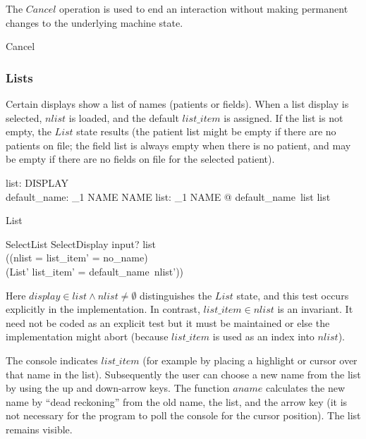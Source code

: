 \documentclass{article}
\begin{document}
The $Cancel$ operation is used to end an interaction without making
permanent changes to the underlying machine state.

\begin{zed} Cancel  \end{zed}

\subsubsection{Lists}

Certain displays show a list of names (patients or fields).  When a
list display is selected, $nlist$ is loaded, and the default $list\_item$
is assigned. If the list is not empty, the $List$ state results (the
patient list might be empty if there are no patients on file; the
field list is always empty when there is no patient, and may be empty
if there are no fields on file for the selected patient).

\begin{axdef}
	list: \power DISPLAY \\
	default\_name: \power_1 NAME \fun NAME 
\where 
	\forall list: \power_1 NAME @ default\_name~list \in list
\end{axdef}


\begin{zed} 
List 
\end{zed}

\begin{schema}{SelectList}
	SelectDisplay
\where
	input? \in list \\
	((nlist = \emptyset \land list\_item' = no\_name) \\
	\lor (List' \land list\_item' = default\_name~nlist'))
\end{schema}
Here $display \in list \land nlist \neq \emptyset$ distinguishes the
$List$ state, and this test occurs explicitly in the implementation.
In contrast, $list\_item \in nlist$ is an invariant.  It need not be
coded as an explicit test but it must be maintained or else the
implementation might abort (because $list\_item$ is used as an index
into $nlist$).

The console indicates $list\_item$ (for example by placing a highlight
or cursor over that name in the list).  Subsequently the user can
choose a new name from the list by using the up and down-arrow keys.
The function $aname$ calculates the new name by ``dead
reckoning'' from the old name, the list, and the arrow key (it is
not necessary for the program to poll the console for the cursor
position).  The list remains visible.
\end{document}
